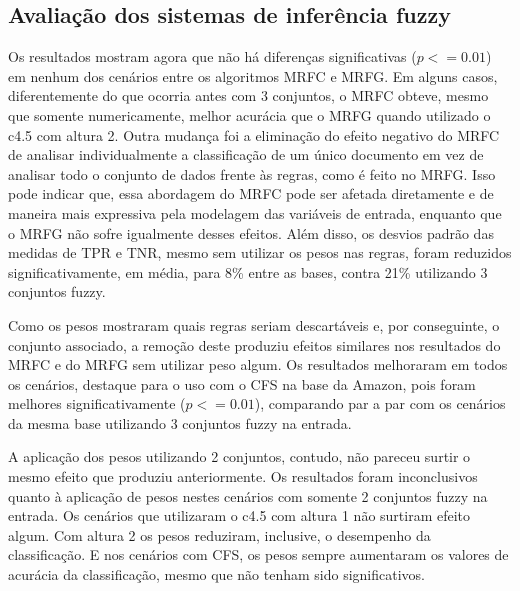 \documentclass[template.tex]{subfiles}
\begin{document}
\subsection{Avaliação dos sistemas de inferência fuzzy}

Os resultados mostram agora que não há diferenças significativas ($p <= 0.01$) em nenhum dos cenários entre os algoritmos  MRFC e MRFG. Em alguns casos, diferentemente do que ocorria antes com 3 conjuntos, o MRFC obteve, mesmo que somente numericamente, melhor acurácia que o MRFG quando utilizado o c4.5 com altura 2. Outra mudança foi a eliminação do efeito negativo do MRFC de analisar individualmente a classificação de um único documento em vez de analisar todo o conjunto de dados frente às regras, como é feito no MRFG. Isso pode indicar que, essa abordagem do MRFC pode ser afetada diretamente e de maneira mais expressiva pela modelagem das variáveis de entrada, enquanto que o MRFG não sofre igualmente desses efeitos. Além disso, os desvios padrão das medidas de TPR e TNR, mesmo sem utilizar os pesos nas regras, foram reduzidos significativamente, em média, para 8\% entre as bases, contra 21\% utilizando 3 conjuntos fuzzy. 

Como os pesos mostraram quais regras seriam descartáveis e, por conseguinte, o conjunto associado, a remoção deste produziu efeitos similares nos resultados do MRFC e do MRFG sem utilizar peso algum. Os resultados melhoraram em todos os cenários, destaque para o uso com o CFS na base da Amazon, pois foram melhores significativamente ($p <= 0.01$), comparando par a par com os cenários da mesma base utilizando 3 conjuntos fuzzy na entrada. 

A aplicação dos pesos utilizando 2 conjuntos, contudo, não pareceu surtir o mesmo efeito que produziu anteriormente. Os resultados foram inconclusivos quanto à aplicação de pesos nestes cenários com somente 2 conjuntos fuzzy na entrada. Os cenários que utilizaram o c4.5 com altura 1 não surtiram efeito algum. Com altura 2 os pesos reduziram, inclusive, o desempenho da classificação. E nos cenários com CFS, os pesos sempre aumentaram os valores de acurácia da classificação, mesmo que não tenham sido significativos. 
\end{document}
